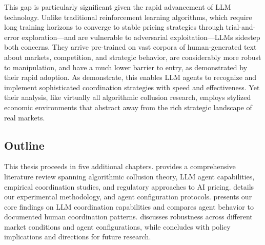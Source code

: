 This gap is particularly significant given the rapid advancement of LLM technology. Unlike traditional reinforcement learning algorithms, which require long training horizons to converge to stable pricing strategies through trial-and-error exploration—and are vulnerable to adversarial exploitation—LLMs sidestep both concerns. They arrive pre-trained on vast corpora of human-generated text about markets, competition, and strategic behavior, are considerably more robust to manipulation, and have a much lower barrier to entry, as demonstrated by their rapid adoption. As \textcite{fish_algorithmic_2025} demonstrate, this enables LLM agents to recognize and implement sophisticated coordination strategies with speed and effectiveness. Yet their analysis, like virtually all algorithmic collusion research, employs stylized economic environments that abstract away from the rich strategic landscape of real markets.

\subsection{Outline}

This thesis proceeds in five additional chapters.  provides a comprehensive literature review spanning algorithmic collusion theory, LLM agent capabilities, empirical coordination studies, and regulatory approaches to AI pricing.  details our experimental methodology, and agent configuration protocols.  presents our core findings on LLM coordination capabilities and compares agent behavior to documented human coordination patterns.  discusses robustness across different market conditions and agent configurations, while  concludes with policy implications and directions for future research.

